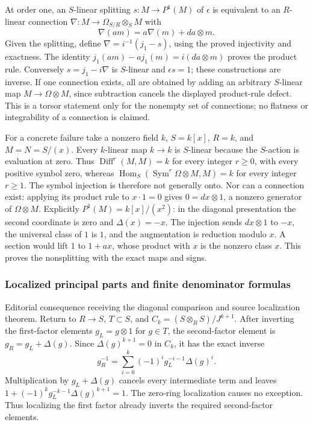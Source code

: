 At order one, an \(S\)-linear splitting \(s:M\to P^1(M)\) of \(\epsilon\) is equivalent to an \(R\)-linear connection \(\nabla:M\to\Omega_{S/R}\otimes_SM\) with \[
\nabla(am)=a\nabla(m)+da\otimes m.
\] Given the splitting, define \(\nabla=i^{-1}(j_1-s)\), using the proved injectivity and exactness. The identity \(j_1(am)-a j_1(m)=i(da\otimes m)\) proves the product rule. Conversely \(s=j_1-i\nabla\) is \(S\)-linear and \(\epsilon s=1\); these constructions are inverse. If one connection exists, all are obtained by adding an arbitrary \(S\)-linear map \(M\to\Omega\otimes M\), since subtraction cancels the displayed product-rule defect. This is a torsor statement only for the nonempty set of connections; no flatness or integrability of a connection is claimed.

For a concrete failure take a nonzero field \(k\), \(S=k[x]\), \(R=k\), and \(M=N=S/(x)\). Every \(k\)-linear map \(k\to k\) is \(S\)-linear because the \(S\)-action is evaluation at zero. Thus \(\operatorname{Diff}^r(M,M)=k\) for every integer \(r\ge0\), with every positive symbol zero, whereas \(\operatorname{Hom}_S(\operatorname{Sym}^r\Omega\otimes M,M)=k\) for every integer \(r\ge1\). The symbol injection is therefore not generally onto. Nor can a connection exist: applying its product rule to \(x\cdot1=0\) gives \(0=dx\otimes1\), a nonzero generator of \(\Omega\otimes M\). Explicitly \(P^1(M)=k[x]/(x^2)\): in the diagonal presentation the second coordinate is zero and \(\Delta(x)=-x\). The injection sends \(dx\otimes1\) to \(-x\), the universal class of \(1\) is \(1\), and the augmentation is reduction modulo \(x\). A section would lift \(1\) to \(1+ax\), whose product with \(x\) is the nonzero class \(x\). This proves the nonsplitting with the exact maps and signs.

\subsubsection{Localized principal parts and finite denominator formulas}\label{algebra-proof-043-localized-principal-parts-and-finite-denominator-formulas}

Editorial consequence receiving the diagonal comparison and source localization theorem. Return to \(R\to S\), \(T\subset S\), and \(C_k=(S\otimes_RS)/J^{k+1}\). After inverting the first-factor elements \(g_L=g\otimes1\) for \(g\in T\), the second-factor element is \(g_R=g_L+\Delta(g)\). Since \(\Delta(g)^{k+1}=0\) in \(C_k\), it has the exact inverse \[
g_R^{-1}=\sum_{i=0}^k(-1)^i g_L^{-i-1}\Delta(g)^i.
\] Multiplication by \(g_L+\Delta(g)\) cancels every intermediate term and leaves \(1+(-1)^kg_L^{-k-1}\Delta(g)^{k+1}=1\). The zero-ring localization causes no exception. Thus localizing the first factor already inverts the required second-factor elements.


